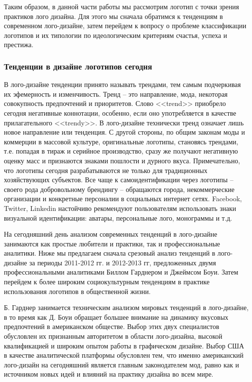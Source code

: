 Таким образом, в данной части работы мы рассмотрим логотип с точки зрения практиков лого
дизайна. Для этого мы сначала обратимся к тенденциям в современном лого-дизайне, затем перейдем к
вопросу о проблеме классификации логотипов и их типологии по идеологическим критериям счастья,
успеха и престижа.

\subsubsection{Тенденции в дизайне логотипов сегодня}
В лого-дизайне тенденции принято называть трендами, тем самым подчеркивая их эфемерность и
изменчивость. Тренд -- это направление, мода, некоторая совокупность предпочтений и
приоритетов. Слово <<trend>> приобрело сегодня негативные коннотации, особенно, если оно употребляется
в качестве прилагательного <<trendy>>. В лого-дизайне технически тренд означает лишь новое направление
или тенденция. С другой стороны, по общим законам моды и коммерции в массовой культуре, оригинальные
логотипы,  становясь трендами, т.е. попадая в тираж и серийное производство, сразу же получают
негативную оценку масс и  признаются знаками пошлости и дурного вкуса. Примечательно, что логотипы
сегодня разрабатываются не только для традиционных хозяйствующих субъектов. Все чаще к
самоидентификации через логотипы -- своего рода добровольному брендингу -- обращаются города,
некоммерческие организации и  конкретные персоналии в социальных интернет сетях. Facebook, Twitter,
Linkedin настойчиво рекомендуют пользователям использовать знаки визуальной идентификации:
аватары, персональные лого, монограммы и т.д.

На сегодняшний день анализом современных тенденций в лого-дизайне занимаются как простые любители и
практики, так и профессиональные аналитики. Ниже мы предлагаем сначала срезовый анализ тенденций в
лого-дизайне за периоды 2011-2012 гг. и 2012-2013 гг,  предложенных двумя профессиональными
аналитиками Биллом Гарднером и Джеймсом Боуи. Затем перейдем к более широким социокультурным
тенденциям в практике использования логотипов в общественной жизни.

Б. Гарднер занимается техническим анализом мировых тенденций в лого-дизайне, в то время как  Д. Боуи
обращает большее внимание на динамику вкусовых предпочтений в американском обществе. Выбор этих двух
специалистов обусловлен их признанным авторитетом в области лого-дизайна,  высокой квалификацией и
широким опытом работы в графическом дизайне.  Выбор США в качестве аналитической платформы
обусловлен  тем, что именно американский лого-дизайн на сегодняшний является главным законодателем
мод, равно как и источником новых идей и влияний на практику дизайна во всем мире.

